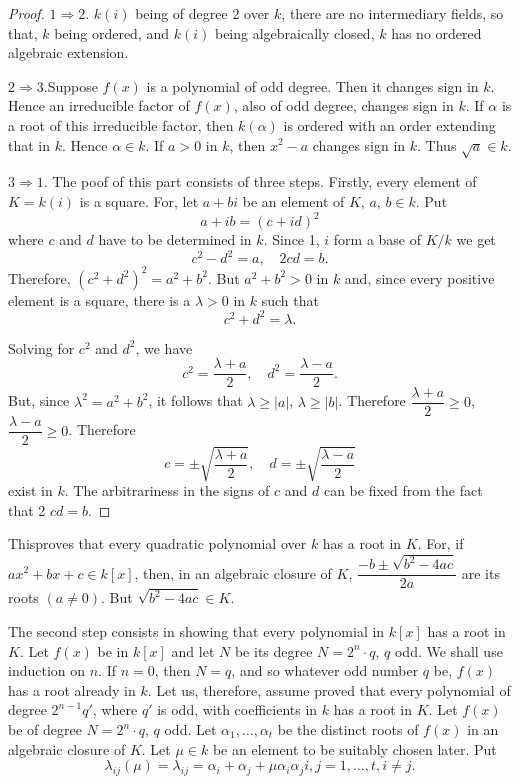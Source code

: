 \begin{proof}
$1\Rightarrow 2$. $k(i)$ being of degree 2 over $k$, there are no
  intermediary fields, so that, $k$ being ordered, and $k(i)$ being
  algebraically closed, $k$ has no ordered algebraic extension.

$2 \Rightarrow 3$.\pageoriginale Suppose $f(x)$ is a polynomial of odd
  degree. Then 
  it changes sign in $k$. Hence an irreducible factor of $f(x)$, also
  of odd degree, changes sign in $k$. If $\alpha$ is a root of this
  irreducible factor, then $k(\alpha)$ is ordered with an order
  extending that in $k$. Hence $\alpha \in k$. If $a>0$ in $k$, then
  $x^2-a$ changes sign in $k$. Thus $\sqrt{a} \in k$.

$3 \Rightarrow 1$. The poof of this part consists of three
  steps. Firstly, every element of $K=k(i)$ is a square. For, let
  $a+bi$ be an element of $K$, $a$, $b\in k$. Put
$$
a+ib = (c+id)^2
$$
where $c$ and $d$ have to be determined in $k$. Since 1, $i$ form a
base of $K/k$ we get
$$
c^2-d^2 = a, \quad 2cd =b.
$$
Therefore, $(c^2+d^2)^2 = a^2+b^2$. But $a^2+b^2>0$ in $k$ and, since
every positive element is a square, there is a $\lambda >0$ in $k$
such that 
$$
c^2+d^2=\lambda.
$$

Solving for $c^2$ and $d^2$, we have
$$
c^2 = \frac{\lambda +a}{2},  \quad  d^2=\frac{\lambda-a}{2}.
$$
But, since $\lambda^2=a^2+b^2$, it follows that $\lambda \geq |a|$,
$\lambda \geq |b|$. Therefore $\dfrac{\lambda+a}{2} \geq 0$,
$\dfrac{\lambda-a}{2} \geq 0$. Therefore
$$
c = \pm \sqrt{\frac{\lambda+a}{2}}, \quad d = \pm
\sqrt{\frac{\lambda-a}{2}} 
$$ 
exist in $k$. The arbitrariness in the signs of $c$ and $d$ can be
fixed from the fact that 2 $cd =b$.
\end{proof}

This\pageoriginale proves that every quadratic polynomial over $k$ has
a root in $K$. For, if $ax^2 + bx + c \in k [x]$, then, in an
algebraic closure of $K$, $\dfrac{-b\pm \sqrt{b^2-4ac}}{2a}$ are its
roots $(a\neq 0)$. But $\sqrt{b^2-4ac} \in K$. 

The second step consists in showing that every polynomial in $k[x]$
has a root in $K$. Let $f(x)$ be in $k[x]$ and let $N$ be its degree
$N=2^n \cdot q$, $q$ odd. We shall use induction on $n$. If $n=0$,
then $N=q$, and so whatever odd number $q$ be, $f(x)$ has a root
already in $k$. Let us, therefore, assume proved that every polynomial
of degree $2^{n-1} q'$, where $q'$ is odd, with coefficients in $k$
has a root in $K$. Let $f(x)$ be of degree $N = 2^n \cdot q$, $q$
odd. Let $\alpha_1, \ldots, \alpha_t$ be the distinct roots of $f(x)$
in an algebraic closure of $K$. Let $\mu \in k$ be an element to be
suitably chosen later. Put 
$$
\lambda_{ij}(\mu) = \lambda_{ij} = \alpha_i  + \alpha_j + \mu \alpha_i
\alpha_j i, j = 1, \ldots, t, i \neq j.
$$

